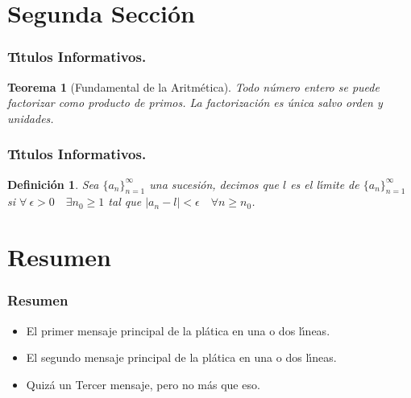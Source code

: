 \documentclass{beamer}  %
\newtheorem{miTeo}{Teorema}
\newtheorem{miDef}{Definici\'on}
\begin{document}
\section{Segunda Secci\'on}

\begin{frame}
  \frametitle{T\'{\i}tulos Informativos.}

  \begin{miTeo}[Fundamental de la Aritm\'etica]

    Todo n\'umero entero se puede factorizar como producto de primos.
    La factorizaci\'on es \'unica salvo orden y unidades.

  \end{miTeo}

\end{frame}

\begin{frame}
  \frametitle{T\'{\i}tulos Informativos.}

  \begin{miDef}
    Sea $\{a_n\}_{n=1}^\infty$ una sucesi\'on, decimos que $l$ es el
    l\'{\i}mite de $\{a_n\}_{n=1}^\infty$ si $\forall\ \epsilon>0
    \quad \exists n_0 \geq 1$ tal que $|a_n - l| < \epsilon \quad
    \forall n\geq n_0$.

  \end{miDef}

\end{frame}


\section*{Resumen}

\begin{frame}
  \frametitle{Resumen}

  \begin{itemize}
  \item El \alert{primer mensaje principal} de la pl\'atica en una o
    dos l\'{\i}neas.
  \item El \alert{segundo mensaje principal} de la pl\'atica en una o
    dos l\'{\i}neas.
  \item Quiz\'a un \alert{Tercer mensaje}, pero no m\'as que eso.
  \end{itemize}
  
\end{frame}
\end{document}
